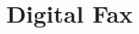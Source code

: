 \documentclass[sigconf,nonacm,9pt]{acmart}
\begin{document}
\title{Digital Fax}

\author{}

\maketitle



\end{document}
